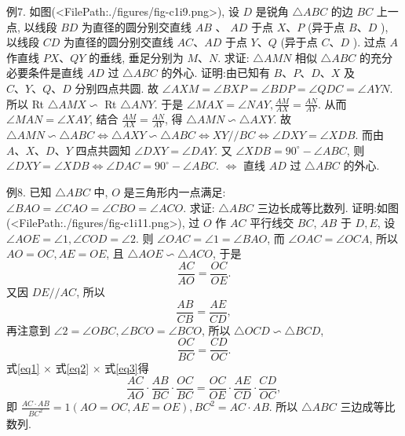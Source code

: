例7. 如图(<FilePath:./figures/fig-c1i9.png>), 设 $D$ 是锐角 $\triangle A B C$ 的边 $B C$ 上一点, 以线段 $B D$ 为直径的圆分别交直线 $A B$ 、 $A D$ 于点 $X 、 P$ (异于点 $B 、 D$ ), 以线段 $C D$ 为直径的圆分别交直线 $A C 、 A D$ 于点 $Y 、 Q$ (异于点 $C 、 D$ ). 过点 $A$ 作直线 $P X 、 Q Y$ 的垂线, 垂足分别为 $M 、 N$. 求证: $\triangle A M N$ 相似 $\triangle A B C$ 的充分必要条件是直线 $A D$ 过 $\triangle A B C$ 的外心.
证明:由已知有 $B 、 P 、 D 、 X$ 及 $C 、 Y 、 Q 、 D$ 分别四点共圆.
故 $\angle A X M=\angle B X P=\angle B D P=\angle Q D C=\angle A Y N$.
所以 Rt $\triangle A M X \backsim$ Rt $\triangle A N Y$.
于是 $\angle M A X=\angle N A Y, \frac{A M}{A X}=\frac{A N}{A Y}$.
从而 $\angle M A N=\angle X A Y$, 结合 $\frac{A M}{A X}=\frac{A N}{A Y}$, 得 $\triangle A M N \backsim \triangle A X Y$.
故 $\triangle A M N \backsim \triangle A B C \Leftrightarrow \triangle A X Y \backsim \triangle A B C \Leftrightarrow X Y / / B C \Leftrightarrow \angle D X Y=\angle X D B$.
而由 $A 、 X 、 D 、 Y$ 四点共圆知 $\angle D X Y= \angle D A Y$.
又 $\angle X D B=90^{\circ}-\angle A B C$, 则
$\angle D X Y=\angle X D B \Leftrightarrow \angle D A C=90^{\circ}-\angle A B C$.
$\Leftrightarrow$ 直线 $A D$ 过 $\triangle A B C$ 的外心.



例8. 已知 $\triangle A B C$ 中, $O$ 是三角形内一点满足: $\angle B A O=\angle C A O=\angle C B O=\angle A C O$. 求证: $\triangle A B C$ 三边长成等比数列.
证明:如图(<FilePath:./figures/fig-c1i11.png>), 过 $O$ 作 $A C$ 平行线交 $B C$, $A B$ 于 $D, E$, 设 $\angle A O E=\angle 1, \angle C O D=\angle 2$.
则 $\angle O A C=\angle 1=\angle B A O$, 而 $\angle O A C=\angle O C A$,
所以 $A O=O C, A E=O E$, 且 $\triangle A O E \backsim \triangle A C O$, 于是
$$
\frac{A C}{A O}=\frac{O C}{O E} . \label{eq1}
$$
又因 $D E / / A C$, 所以
$$
\frac{A B}{C B}=\frac{A E}{C D}, \label{eq2}
$$
再注意到 $\angle 2=\angle O B C, \angle B C O=\angle B C O$, 所以 $\triangle O C D \backsim \triangle B C D$,
$$
\frac{O C}{B C}=\frac{C D}{O C} . \label{eq3}
$$
式\ref{eq1} $\times$ 式\ref{eq2} $\times$ 式\ref{eq3}得
$$
\frac{A C}{A O} \cdot \frac{A B}{B C} \cdot \frac{O C}{B C}=\frac{O C}{O E} \cdot \frac{A E}{C D} \cdot \frac{C D}{O C},
$$
即 $\frac{A C \cdot A B}{B C^2}=1(A O=O C, A E=O E), B C^2=A C \cdot A B$.
所以 $\triangle A B C$ 三边成等比数列.



